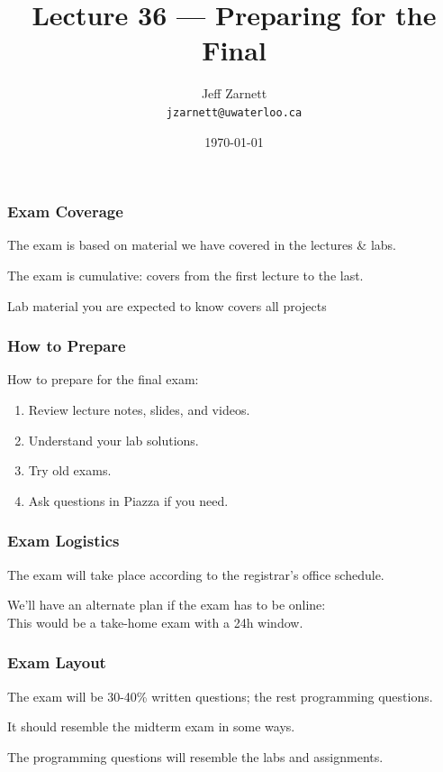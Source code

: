 

\title{Lecture 36 --- Preparing for the Final }

\author{Jeff Zarnett \\ \small \texttt{jzarnett@uwaterloo.ca}}
\date{\today}




\begin{frame}
  \titlepage

\end{frame}

\begin{frame}
\frametitle{Exam Coverage}

The exam is based on material we have covered in the lectures \& labs.

The exam is cumulative: covers from the first lecture to the last.

Lab material you are expected to know covers all projects

\end{frame}

\begin{frame}
\frametitle{How to Prepare}

How to prepare for the final exam:

\begin{enumerate}
	\item Review lecture notes, slides, and videos.
	\item Understand your lab solutions.
	\item Try old exams.
	\item Ask questions in Piazza if you need.
\end{enumerate}

\end{frame}


\begin{frame}
\frametitle{Exam Logistics}

The exam will take place according to the registrar's office schedule.

We'll have an alternate plan if the exam has to be online:\\
\quad This would be a take-home exam with a 24h window.

\end{frame}


\begin{frame}
\frametitle{Exam Layout}

The exam will be 30-40\% written questions; the rest programming questions.

It should resemble the midterm exam in some ways.

The programming questions will resemble the labs and assignments.

\end{frame}


